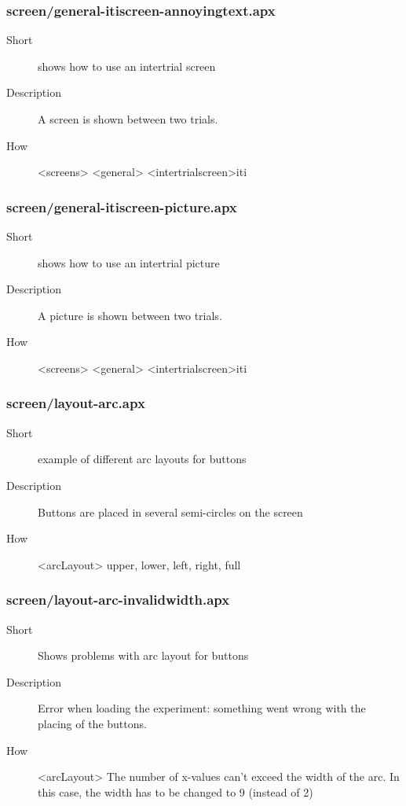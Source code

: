 \subsubsection{screen/general-itiscreen-annoyingtext.apx}
\begin{description}
\item[Short] 
 shows how to use an intertrial screen
\item[Description] 
 A screen is shown between two trials.
\item[How] 
 \textless{}screens\textgreater{} \textless{}general\textgreater{} \textless{}intertrialscreen\textgreater{}iti
\end{description}

\subsubsection{screen/general-itiscreen-picture.apx}
\begin{description}
\item[Short] 
 shows how to use an intertrial picture
\item[Description] 
 A picture is shown between two trials.
\item[How] 
 \textless{}screens\textgreater{} \textless{}general\textgreater{} \textless{}intertrialscreen\textgreater{}iti
\end{description}

\subsubsection{screen/layout-arc.apx}
\begin{description}
\item[Short] 
 example of different arc layouts for buttons
\item[Description] 
 Buttons are placed in several semi-circles on the screen
\item[How] 
 \textless{}arcLayout\textgreater{} upper, lower, left, right, full
\end{description}

\subsubsection{screen/layout-arc-invalidwidth.apx}
\begin{description}
\item[Short] 
 Shows problems with arc layout for buttons
\item[Description] 
 Error when loading the experiment: something went wrong with the placing of the buttons.
\item[How] 
 \textless{}arcLayout\textgreater{} The number of x-values can't exceed the width of the arc. In this case, the width has to be changed to 9 (instead of 2)
\end{description}

